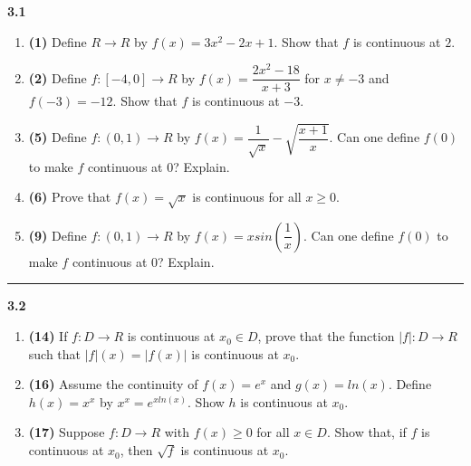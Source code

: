 \documentclass[fleqn]{article}
\begin{document}
  \textbf{3.1}
  \begin{enumerate}
    \item \textbf{(1)} Define $R \longrightarrow R$ by $f(x)=3x^2-2x+1$. Show that $f$ is continuous at $2$.

        


    \item \textbf{(2)} Define $f: [-4, 0] \longrightarrow R$ by $f(x)=\dfrac{2x^2-18}{x+3}$ for $x \neq -3$ and $f(-3)=-12$. Show 
    that $f$ is continuous at $-3$.

        


    \item \textbf{(5)} Define $f: (0, 1) \longrightarrow R$ by $f(x)=\dfrac{1}{\sqrt{x}}-\sqrt{\dfrac{x+1}{x}}$. Can one define
    $f(0)$ to make $f$ continuous at $0$? Explain. 

        


    \item \textbf{(6)} Prove that $f(x)=\sqrt{x}$ is continuous for all $x \geq 0$.

        
    

    \item \textbf{(9)} Define $f: (0, 1) \longrightarrow R$ by $f(x)=x sin(\dfrac{1}{x})$. Can one define
    $f(0)$ to make $f$ continuous at $0$? Explain.

        

  \end{enumerate}  

  \rule{15cm}{2pt}

  \textbf{3.2}
  \begin{enumerate}
    \item \textbf{(14)} If $f: D \longrightarrow R$ is continuous at $x_0 \in D$, prove that the function $|f|: D \longrightarrow R$
    such that $|f|(x)=|f(x)|$ is continuous at $x_0$.

        


    \item \textbf{(16)} Assume the continuity of $f(x)=e^x$ and $g(x)=ln(x)$. Define $h(x)=x^x$ by $x^x=e^{x ln(x)}$. Show $h$ is continuous
    at $x_0$.

        
    

    \item \textbf{(17)} Suppose $f: D \longrightarrow R$ with $f(x) \geq 0$ for all $x \in D$. Show that, if $f$ is continuous at $x_0$, then
    $\sqrt{f}$ is continuous at $x_0$.

        

  \end{enumerate}
\end{document}
